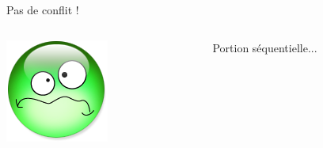 \documentclass[xcolor={x11names,svgnames}]{beamer}
\begin{document}
\begin{frame}[label=sparse_lu_MIS]
\begin{columns}[c]
\begin{column}[c]{.9\textwidth}
      Pas de conflit !
      
    \end{column}
  \end{columns}

  \bigskip
  
  \begin{columns}[c]
    \begin{column}{.1\textwidth}
      \includegraphics[width=\textwidth]{triste.png}
    \end{column}
    \begin{column}[c]{.9\textwidth}

      Portion séquentielle...
      
    \end{column}
  \end{columns}
\end{frame}


\end{document}
